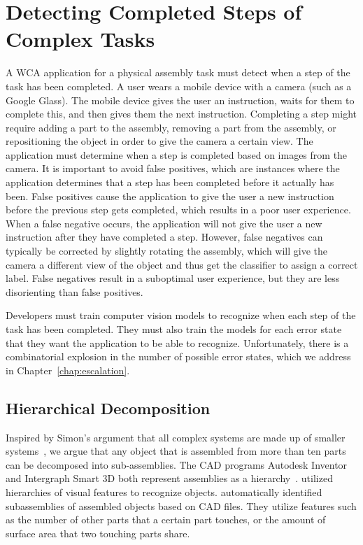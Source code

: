 \chapter{Detecting Completed Steps of Complex Tasks}\label{chap:detection}

A WCA application for a physical assembly task must detect when a step of the
task has been completed.
A user wears a mobile device with a camera (such as a Google Glass).
The mobile
device gives the user an instruction, waits for them to complete this, and then
gives them the next instruction.
Completing a step might require adding a part to the assembly,
removing a part from the assembly, or repositioning the object in order to give
the camera a certain view.
The application must determine when a step is completed
based on images from the camera.
It is important to avoid false positives, which are instances where the
application determines that a step has been completed before it actually has
been.
False positives cause the application to give the user a new instruction before
the previous step gets completed, which results in a poor user experience.
When a false negative occurs, the application will not give the user a new
instruction after they have completed a step.
However, false negatives can typically be corrected by slightly rotating the
assembly, which will give the camera a different view of the object and thus get
the classifier to assign a correct label.
False negatives result in a suboptimal user experience, but they
are less disorienting than false positives.

Developers must train computer vision models to recognize when each step of the
task has been completed.
They must also train the models for each error state that they want the
application to be able to recognize.
Unfortunately, there is a combinatorial explosion in the number of possible
error states, which we address in Chapter~\ref{chap:escalation}.

\section{Hierarchical Decomposition}

Inspired by Simon's argument that
all complex systems are made up of smaller systems~\cite{Simon1991}, we argue
that any object that is assembled from more than ten parts can be decomposed
into sub-assemblies.
The CAD programs Autodesk Inventor and Intergraph Smart 3D both represent
assemblies as a
hierarchy~\cite{autodesk_hierarchy, intergraph_hierarchy}.
\citet{semantic_hierarchy} utilized hierarchies of visual features to recognize
objects.
\citet{subassembly_identification} automatically identified subassemblies of
assembled objects based on CAD files.
They utilize features such as the number of other parts that a certain part
touches, or the amount of surface area that two touching parts share.

